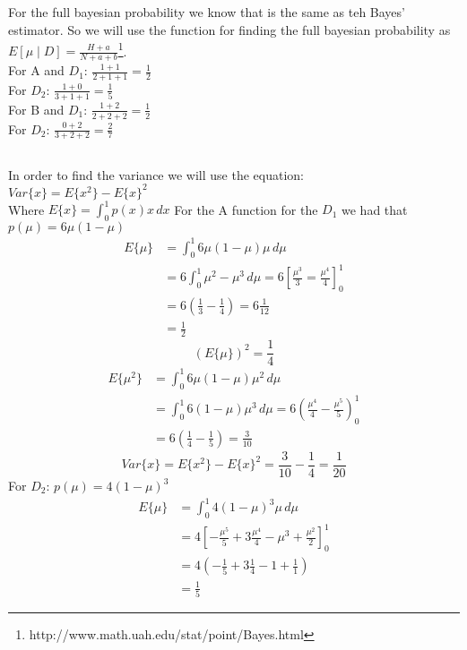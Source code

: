 \subsection{}
For the full bayesian probability we know that is the same as teh Bayes' estimator.
So we will use the function for finding the full bayesian probability as $E[\mu\mid D] = \frac{H+a}{N+a+b}$\footnote{http://www.math.uah.edu/stat/point/Bayes.html}.\\
For A and $D_1$: $\frac{1+1}{2+1+1} = \frac{1}{2}$\\
For $D_2$: $\frac{1+0}{3+1+1} = \frac{1}{5}$\\
For B and $D_1$: $\frac{1+2}{2+2+2} = \frac{1}{2}$\\
For $D_2$: $\frac{0+2}{3+2+2} = \frac{2}{7}$\\
\subsection{}
In order to find the variance we will use the equation:\\
$Var\{x\} = E\{x^2\} - E\{x\}^2$\\
Where $E\{x\} = \int_0^1 p(x)x \,dx$
For the A function for the $D_1$ we had that $p(\mu) = 6\mu(1-\mu)$
\begin{align*}
E\{\mu\} &= \int_0^1 6\mu(1-\mu)\mu \,d\mu \\
&= 6 \int_0^1 \mu^2-\mu^3 \,d\mu
 = 6 [\frac{\mu^3}{3} = \frac{\mu^4}{4}]_0^1 \\
&= 6 (\frac{1}{3} - \frac{1}{4})
 = 6 \frac{1}{12} \\
&= \frac{1}{2}
\end{align*}
\begin{equation*}
(E\{\mu\})^2 = \frac{1}{4}
\end{equation*}
\begin{align*}
E\{\mu^2\} &= \int_0^1 6\mu(1-\mu)\mu^2 \,d\mu\\
&= \int_0^1 6(1-\mu)\mu^3 \,d\mu = 6(\frac{\mu^4}{4}-\frac{\mu^5}{5})_0^1\\
&= 6(\frac{1}{4}-\frac{1}{5}) = \frac{3}{10}
\end{align*}
\begin{equation*}
Var\{x\} =E\{x^2\} - E\{x\}^2  = \frac{3}{10} - \frac{1}{4} = \frac{1}{20}
\end{equation*}
For $D_2$: $p(\mu) = 4(1-\mu)^3$
\begin{align*}
E\{\mu\} &= \int_0^1 4(1-\mu)^3\mu \,d\mu \\
&= 4 [-\frac{\mu^5}{5} + 3\frac{\mu^4}{4} - \mu^3 + \frac{\mu^2}{2}]_0^1\\
&= 4 (-\frac{1}{5} + 3\frac{1}{4}  -1 + \frac{1}{1}) \\
&= \frac{1}{5}
\end{align*}
